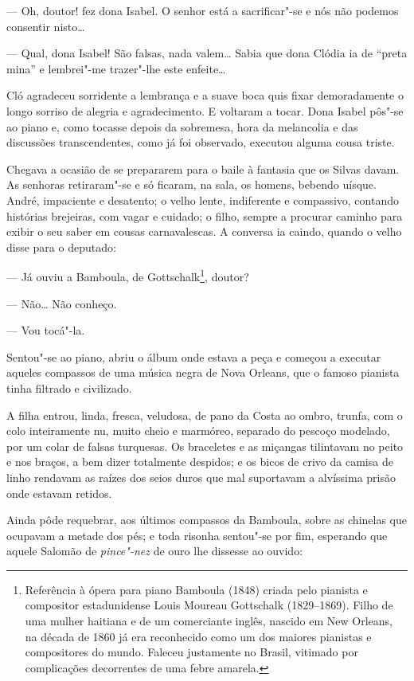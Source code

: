 --- Oh, doutor! fez dona Isabel. O senhor está a sacrificar"-se e nós não
podemos consentir nisto\ldots{}

--- Qual, dona Isabel! São falsas, nada valem\ldots{} Sabia que dona Clódia ia
de ``preta mina'' e lembrei"-me trazer"-lhe este enfeite\ldots{}

Cló agradeceu sorridente a lembrança e a suave boca quis fixar
demoradamente o longo sorriso de alegria e agradecimento. E voltaram a
tocar. Dona Isabel pôs"-se ao piano e, como tocasse depois da sobremesa,
hora da melancolia e das discussões transcendentes, como já foi
observado, executou alguma cousa triste.

Chegava a ocasião de se prepararem para o baile à fantasia que os Silvas
davam. As senhoras retiraram"-se e só ficaram, na sala, os homens,
bebendo uísque. André, impaciente e desatento; o velho lente,
indiferente e compassivo, contando histórias brejeiras, com vagar e
cuidado; o filho, sempre a procurar caminho para exibir o seu saber em
cousas carnavalescas. A conversa ia caindo, quando o velho disse para o
deputado:

--- Já ouviu a Bamboula, de Gottschalk\footnote{Referência à ópera para
  piano Bamboula (1848) criada pelo pianista e compositor estadunidense
  Louis Moureau Gottschalk (1829--1869). Filho de uma mulher haitiana
  e de um comerciante inglês, nascido em New Orleans, na década de 1860
  já era reconhecido como um dos maiores pianistas e compositores do
  mundo. Faleceu justamente no Brasil, vitimado por complicações
  decorrentes de uma febre amarela.}, doutor?

--- Não\ldots{} Não conheço.

--- Vou tocá"-la.

Sentou"-se ao piano, abriu o álbum onde estava a peça e começou a
executar aqueles compassos de uma música negra de Nova Orleans, que o
famoso pianista tinha filtrado e civilizado.

A filha entrou, linda, fresca, veludosa, de pano da Costa ao ombro,
trunfa, com o colo inteiramente nu, muito cheio e marmóreo, separado do
pescoço modelado, por um colar de falsas turquesas. Os braceletes e as
miçangas tilintavam no peito e nos braços, a bem dizer totalmente
despidos; e os bicos de crivo da camisa de linho rendavam as raízes dos
seios duros que mal suportavam a alvíssima prisão onde estavam retidos.

Ainda pôde requebrar, aos últimos compassos da Bamboula, sobre as
chinelas que ocupavam a metade dos pés; e toda risonha sentou"-se por
fim, esperando que aquele Salomão de \emph{pince"-nez} de ouro lhe
dissesse ao ouvido:


